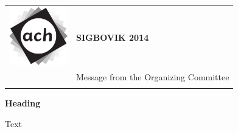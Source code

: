 \documentclass[12pt]{article}
\begin{document}
{\sffamily
\begin{tabular}{ll}
\multirow{3}{*}{\includegraphics[width=1in]{ach.png}}\\
& \textbf{\Huge{SIGBOVIK 2014}} \\ &\\
& \LARGE{Message from the Organizing Committee} \\
&\\
\hline
\end{tabular}}
\vspace{2em}

{\large \bf \sffamily Heading}

Text
\end{document}
